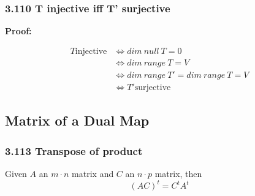 \documentclass{article}
\begin{document}
\subsubsection*{3.110 T injective iff T' surjective}
\textbf{Proof:}
\begin{addmargin}[1em]{0em}
    \begin{equation*}
        \begin{split}
            T \mathrm{ injective} &\iff dim\ null\ T = 0\\
            &\iff dim\ range\ T = V\\
            &\iff dim\ range\ T' = dim\ range\ T = V\\
            &\iff T' \mathrm{ surjective}
        \end{split}
    \end{equation*}
\end{addmargin}
\subsection*{Matrix of a Dual Map}
\subsubsection*{3.113 Transpose of product}
Given $A$ an $m \cdot n$ matrix and $C$ an $n \cdot p$ matrix, then
\begin{equation*}
    (AC)^t = C^tA^t
\end{equation*}
\end{document}
